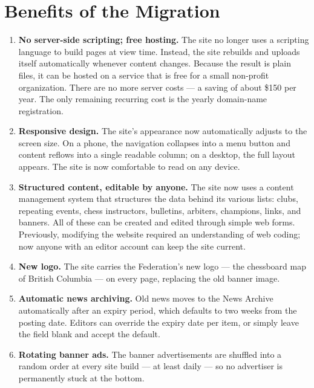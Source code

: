 \documentclass[12pt,letterpaper]{article}
\begin{document}
\section{Benefits of the Migration}
\label{sec:benefits}

\begin{enumerate}
  \item \textbf{No server-side scripting; free hosting.} The site no longer
  uses a scripting language to build pages at view time. Instead, the site
  rebuilds and uploads itself automatically whenever content changes.
  Because the result is plain files, it can be hosted on a service that is
  free for a small non-profit organization. There are no more server costs
  --- a saving of about \$150 per year. The only remaining recurring cost is
  the yearly domain-name registration.

  \item \textbf{Responsive design.} The site's appearance now automatically
  adjusts to the screen size. On a phone, the navigation collapses into a
  menu button and content reflows into a single readable column; on a
  desktop, the full layout appears. The site is now comfortable to read on
  any device.

  \item \textbf{Structured content, editable by anyone.} The site now uses
  a content management system that structures the data behind its various
  lists: clubs, repeating events, chess instructors, bulletins, arbiters,
  champions, links, and banners. All of these can be created and edited
  through simple web forms. Previously, modifying the website required an
  understanding of web coding; now anyone with an editor account can keep
  the site current.

  \item \textbf{New logo.} The site carries the Federation's new logo ---
  the chessboard map of British Columbia --- on every page, replacing the
  old banner image.

  \item \textbf{Automatic news archiving.} Old news moves to the News
  Archive automatically after an expiry period, which defaults to two weeks
  from the posting date. Editors can override the expiry date per item, or
  simply leave the field blank and accept the default.

  \item \textbf{Rotating banner ads.} The banner advertisements are
  shuffled into a random order at every site build --- at least daily ---
  so no advertiser is permanently stuck at the bottom.
\end{enumerate}
\end{document}
